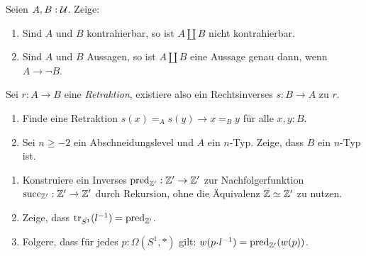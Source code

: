 \documentclass{uebung}
\begin{document}

\begin{exercise}
  Seien $A,B:\mathcal{U}$.
  Zeige:
  \begin{enumerate}
    \item Sind $A$ und $B$ kontrahierbar, so ist $A \amalg B$ nicht kontrahierbar.
    \item Sind $A$ und $B$ Aussagen, so ist $A \amalg B$ eine Aussage genau dann, wenn $A \to \neg B$.
  \end{enumerate}
\end{exercise}

\begin{exercise}
  Sei $r:A \to B$ eine \emph{Retraktion}, existiere also ein Rechtsinverses $s:B \to A$ zu $r$.
  \begin{enumerate}
    \item Finde eine Retraktion $s(x) =_A s(y) \to x=_B y$ für alle $x,y:B$.
    \item Sei $n\geq -2$ ein Abschneidungslevel und $A$ ein $n$-Typ.
      Zeige, dass $B$ ein $n$-Typ ist.
  \end{enumerate}
\end{exercise}

\begin{exercise}
  \begin{enumerate}
    \item Konstruiere ein Inverses $\mathrm{pred}_{\mathbb{Z}'}:\mathbb{Z}'\to\mathbb{Z}'$ zur Nachfolgerfunktion $\mathrm{succ}_{\mathbb{Z}'}:\mathbb{Z}'\to\mathbb{Z}'$ durch Rekursion, ohne die Äquivalenz $\mathbb{Z}\simeq\mathbb{Z}'$ zu nutzen.
    \item Zeige, dass $\mathrm{tr}_{\tilde{S^1}}(l^{-1})=\mathrm{pred}_{\mathbb{Z}'}$.
    \item Folgere, dass für jedes $p:\Omega(S^1,\ast)$ gilt: $w(p\kon l^{-1})=\mathrm{pred}_{\Z'}(w(p))$.
  \end{enumerate}
\end{exercise}
\end{document}
